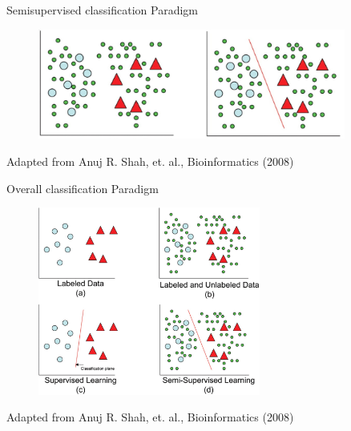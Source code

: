 \documentclass[utf8, a4paper]{beamer}
\begin{document}
\begin{frame} {Semisupervised classification Paradigm} 

\vspace{-0.9cm}

\begin{figure}
\centering
  \includegraphics[trim={0cm 0cm 0cm 0cm},clip, width=0.9\textwidth]{images/sermisupervised}
\end{figure}
\tiny{Adapted from Anuj R. Shah, et. al.,  Bioinformatics (2008) }

\end{frame}

\begin{frame} {Overall classification Paradigm} 

\vspace{-0.9cm}

\begin{figure}
\centering
  \includegraphics[trim={0cm 0cm 0cm 0cm},clip, width=0.65\textwidth]{images/all}
\end{figure}
\vspace{-0.7cm}
\tiny{Adapted from Anuj R. Shah, et. al.,  Bioinformatics (2008) }
\end{frame}
\end{document}
